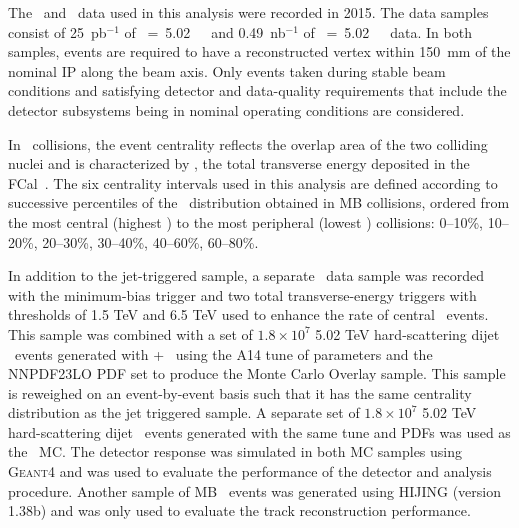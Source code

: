 
The \PbPb\ and \pp\ data used in this analysis were recorded in 2015.
 The data samples consist of 25~pb$^{-1}$ of \sqrts~=~5.02~\TeV\ \pp\ and 0.49~nb$^{-1}$ of \sqrtsnn~=~5.02~\TeV\
\pbpb\ data. In both samples, events are required to have a reconstructed vertex
within 150~mm of the nominal IP along the beam axis.
Only events taken during stable beam conditions and satisfying detector and data-quality requirements that include the detector subsystems being in nominal operating conditions are considered. 



In \PbPb\ collisions, the event centrality reflects the overlap area of the two colliding nuclei and is characterized by \ETfcal, the total transverse energy deposited in the 
FCal~\cite{Aaboud:2017tql}. The six centrality intervals used in this analysis are defined according to successive percentiles of the \ETfcal\ distribution obtained in MB collisions, ordered from the most central (highest \ETfcal) to the most peripheral (lowest \ETfcal) collisions: 0--10\%, 10--20\%, 20--30\%, 30--40\%, 40--60\%, 60--80\%. 

In addition to the jet-triggered sample, a separate \PbPb\ data sample was recorded with the minimum-bias trigger and two total transverse-energy triggers with thresholds of 1.5 TeV and 6.5 TeV used to enhance the rate of central \pbpb\ events. This sample was combined with a set of $1.8\times10^7$ 5.02 TeV hard-scattering dijet \pp\ events generated with \powheg{}+\pythiaeight\ \cite{Nason:2004rx,Sjostrand:2014zea} using the A14 tune of parameters \cite{ATLAS2014021} and the NNPDF23LO PDF set \cite{Ball:2012cx} to produce the Monte Carlo Overlay sample. This sample is reweighed on an event-by-event basis such that it has the same centrality distribution as the jet triggered sample.
A separate set of $1.8\times10^7$ 5.02 TeV hard-scattering dijet \pp\ events generated with the same tune and PDFs was used as the \pp\ MC. The detector response was simulated in both MC samples using \textsc{Geant4} \cite{Agostinelli:2002hh,Aad:2010ah} and was used to evaluate the performance of the detector and analysis procedure. Another sample of MB \pbpb\ events was generated using HIJING (version 1.38b) \cite{Aad:2010ah} and was only used to evaluate the track reconstruction performance. 	


